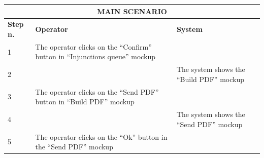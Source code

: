 {{{			\begin{table}[h]
			\begin{tabular}{|p{2cm}|p{6cm}|p{6cm}|}
			\hline
				\multicolumn{3}{|c|}{MAIN SCENARIO}\\
			\hline
				\centering \vspace{1mm} \bfseries{Step n.} \vspace{1mm} & \vspace{1mm} \bfseries{Operator} \vspace{1mm} & \vspace{1mm} \bfseries{System} \vspace{1mm}\\
			\hline
				\vspace{1mm} 1\vspace{1mm} &
				\vspace{1mm} The operator clicks on the “Confirm” button in “Injunctions queue” mockup\vspace{1mm} & 
				\vspace{1mm} \vspace{1mm} \\
			\hline
				\vspace{1mm} 2\vspace{1mm} &
				\vspace{1mm} \vspace{1mm} & 
				\vspace{1mm} The system shows the “Build PDF” mockup\vspace{1mm} \\
			\hline
				\vspace{1mm} 3\vspace{1mm} &
				\vspace{1mm} The operator clicks on the “Send PDF” button in “Build PDF” mockup\vspace{1mm} & 
				\vspace{1mm} \vspace{1mm} \\
			\hline
				\vspace{1mm} 4\vspace{1mm} &
				\vspace{1mm} \vspace{1mm} & 
				\vspace{1mm} The system shows the “Send PDF” mockup\vspace{1mm} \\
			\hline
				\vspace{1mm} 5\vspace{1mm} &
				\vspace{1mm} The operator clicks on the “Ok” button in the “Send PDF” mockup\vspace{1mm} & 

\end{tabular}
\end{table}}}}
